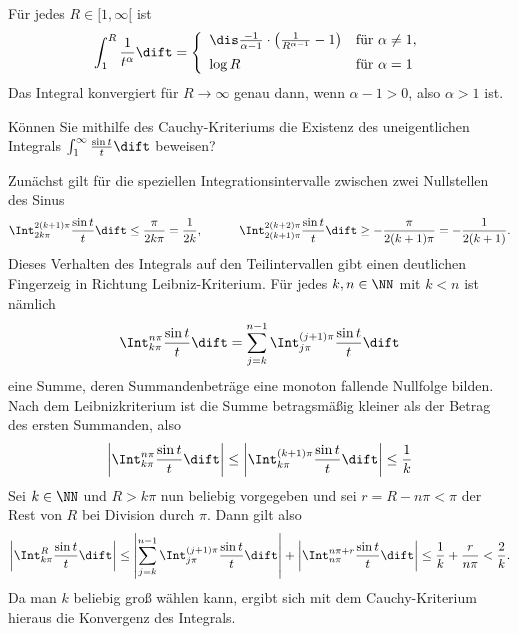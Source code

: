   \begin{antwort}
    Für jedes $R\in [1,\infty[$ ist 
    \[
    \int_1^R \frac{1}{t^\alpha} \dift = \left\{ \begin{array}{ll}
        \dis \frac{-1}{\alpha-1} \cdot \left( \frac{1}{R^{\alpha-1}}-1 \right) &  
        \text{für $\alpha\not=1$}, \\[2mm]
        \log R  & \text{für $\alpha=1$}
      \end{array}\right.
    \]
    Das Integral konvergiert für $R\to\infty$ genau dann, wenn 
    $\alpha-1>0$, also $\alpha>1$ ist.
    \AntEnd
  \end{antwort}

  \begin{frage}\label{07_sinxdurchx}
    Können Sie mithilfe des Cauchy-Kriteriums die Existenz des 
    uneigentlichen Integrals $\int_1^\infty \frac{\sin t}{t}\dift$ 
    beweisen? 
  \end{frage}

  \begin{antwort}
    Zunächst gilt für die speziellen Integrationsintervalle 
    zwischen zwei Nullstellen des Sinus
    \[
    \Int_{2k\pi}^{2(k+1)\pi} \frac{\sin t}{t} \dift \le \frac{\pi}{2k\pi} =
    \frac{1}{2k},
    \quad\qquad
    \Int_{2(k+1)\pi}^{2(k+2)\pi} \frac{\sin t}{t} \dift 
    \ge -\frac{\pi}{2(k+1)\pi}=-\frac{1}{2(k+1)}.
    \]
    Dieses Verhalten des Integrals auf den Teilintervallen
    gibt einen deutlichen Fingerzeig in Richtung Leibniz-Kriterium. 
    Für jedes $k,n\in \NN$ mit $k<n$ ist nämlich 
    \[
    \Int_{k\pi}^{n\pi} \frac{\sin t}{t}\dift = 
    \sum_{j=k}^{n-1} \Int_{j\pi}^{(j+1)\pi} \frac{\sin t}{t}\dift 
    \]
    eine  Summe, deren Summandenbeträge eine monoton 
    fallende Nullfolge bilden. Nach dem Leibnizkriterium ist die Summe 
    betragsmäßig kleiner als der Betrag des ersten Summanden, also  
    \[
    \left| \Int_{k\pi}^{n\pi} \frac{\sin t}{t}\dift \right| \le 
    \left| \Int_{k\pi}^{(k+1)\pi} \frac{\sin t}{t} \dift \right| \le 
    \frac{1}{k}
    \]
    Sei $k\in \NN$ und $R>k\pi$ nun beliebig vorgegeben und 
    sei $r=R-n\pi<\pi$ der Rest von $R$ bei Division durch $\pi$. 
    Dann gilt also 
    \[
    \left| \Int_{k\pi}^{R} \frac{\sin t}{t} \dift \right|
    \le
    \left| \sum_{j=k}^{n-1}
      \Int_{j\pi}^{(j+1)\pi} \frac{\sin t}{t} \dift \right|
    + \left|\Int_{n\pi}^{n\pi+r}  \frac{\sin t}{t} \dift \right| 
    \le 
    \frac{1}{k} + \frac{r}{n\pi} < 
    \frac{2}{k}.
    \]
    Da man $k$ beliebig groß wählen kann, ergibt sich mit dem  
    Cauchy-Kriterium hieraus die Konvergenz des Integrals. 
    \AntEnd  
  \end{antwort}

